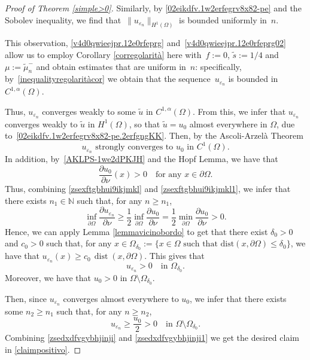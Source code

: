 \documentclass[12pt,a4paper,intlimits,sumlimits]{amsart}
\def \N {\mathbb{N}}
\theoremstyle{definition}
\theoremstyle{plain}
\numberwithin{equation}{section}
\renewcommand{\leq}{\leqslant}
\renewcommand{\geq}{\geqslant}
\begin{document}
\begin{proof}[Proof of Theorem \ref{simple>0}]
Similarly, by \eqref{02eikdfv.1w2erfegrv8x82-pe} and the Sobolev
inequality, we find that~$\|u_{\varepsilon_n}\|_{H^1(\Omega)}$ is bounded uniformly in~$n$.

This observation, \eqref{v4d0qwieejpr.12e0rfeprg} and~\eqref{v4d0qwieejpr.12e0rfeprg02}
allow us to 
employ Corollary \ref{corregolarità}
here with~$f:=0$, $\widetilde s:=1/4$ and~$\mu:=\widetilde\mu_n^-$
and obtain estimates that are uniform in~$n$:
specifically, by~\eqref{inequalityregolaritàcor} we obtain that the sequence~$u_{\varepsilon_n}$ is bounded in $C^{1,\alpha}(\Omega)$.

Thus, $u_{\varepsilon_n}$ converges weakly to some $\tilde{u}$ in
$C^{1,\alpha}(\Omega)$. From this, we infer that $u_{\varepsilon_n}$ converges weakly to $\tilde{u}$ in $H^1(\Omega)$, so that $\tilde{u}=u_0$ almost everywhere in $\Omega$, due to~\eqref{02eikdfv.1w2erfegrv8x82-pe.2erfgngKK}. Then, by the Ascoli-Arzelà Theorem
\begin{equation}\label{zsexftgbhui9ikjmkl}
u_{\varepsilon_n} \mbox{ strongly converges to } u_0 \mbox{ in }
C^1(\Omega).
\end{equation}
In addition, by~\eqref{AKLPS-1we2dPKJH} and the Hopf Lemma, we have that
\begin{equation}\label{zsexftgbhui9ikjmkl1}
\frac{\partial u_0}{\partial \nu}(x)>0 
\quad \mbox{for any } x\in \partial \Omega.
\end{equation}
Thus, combining \eqref{zsexftgbhui9ikjmkl} and \eqref{zsexftgbhui9ikjmkl1}, we infer that there exists $n_1\in \N$ such that,
for any $n\geq n_1$,
\[
\inf_{\partial \Omega}\frac{\partial u_{\varepsilon_n}}{\partial \nu}\geq \frac{1}{2}\inf_{\partial \Omega}\frac{\partial u_0}{\partial \nu}=\frac{1}{2}\min_{\partial \Omega}\frac{\partial u_0}{\partial \nu}>0.
\]
Hence, we can apply Lemma \ref{lemmavicinobordo} to get that there exist $\delta_0>0$ and $c_0>0$ such that, for any $x\in \Omega_{\delta_0}:=\{x\in \Omega \mbox{ such that dist}(x,\partial \Omega)\leq \delta_0\}$, we have that $u_{\varepsilon_n}(x)\geq c_0\, \operatorname{dist}(x,\partial \Omega)$. This gives that
\begin{equation}\label{zsedxdfvgybhjinji}
u_{\varepsilon_n}>0 \quad \mbox{in }\Omega_{\delta_0}.
\end{equation}
Moreover, we have that $u_0>0$ in $\Omega\setminus \Omega_{\delta_0}$. 

Then, since $u_{\varepsilon_n}$ converges almost everywhere to $u_0$, we infer that there exists some $n_2\geq n_1$ such that,
for any $n\geq n_2$,
\begin{equation}\label{zsedxdfvgybhjinji1}
u_{\varepsilon_n} \geq \frac{u_0}{2}>0 \quad \mbox{in }\Omega\setminus \Omega_{\delta_0}.
\end{equation}
Combining \eqref{zsedxdfvgybhjinji} and \eqref{zsedxdfvgybhjinji1}
we get the desired claim in \eqref{claimpositivo}.


\end{proof}
\end{document}
